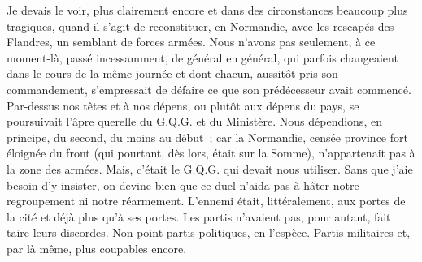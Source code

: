 \documentclass[french,twoside]{book} %
\begin{document}
Je devais le voir, plus clairement encore et dans des circonstances beaucoup plus tragiques, quand il s’agit de reconstituer, en Normandie, avec les rescapés des Flandres, un semblant de forces armées. Nous n’avons pas seulement, à ce moment-là, passé incessamment, de général en général, qui parfois changeaient dans le cours de la même journée et dont chacun, aussitôt pris son commandement, s’empressait de défaire ce que son prédécesseur avait commencé. Par-dessus nos têtes et à nos dépens, ou plutôt aux dépens du pays, se poursuivait l’âpre querelle du G.Q.G. et du Ministère. Nous dépendions, en principe, du second, du moins au début ; car la   Normandie, censée province fort éloignée du front (qui pourtant, dès lors, était sur la Somme), n’appartenait pas à la zone des armées. Mais, c’était le G.Q.G. qui devait nous utiliser. Sans que j’aie besoin d’y insister, on devine bien que ce duel n’aida pas à hâter notre regroupement ni notre réarmement. L’ennemi était, littéralement, aux portes de la cité et déjà plus qu’à ses portes. Les partis n’avaient pas, pour autant, fait taire leurs discordes. Non point partis politiques, en l’espèce. Partis militaires et, par là même, plus coupables encore.\par
\end{document}
